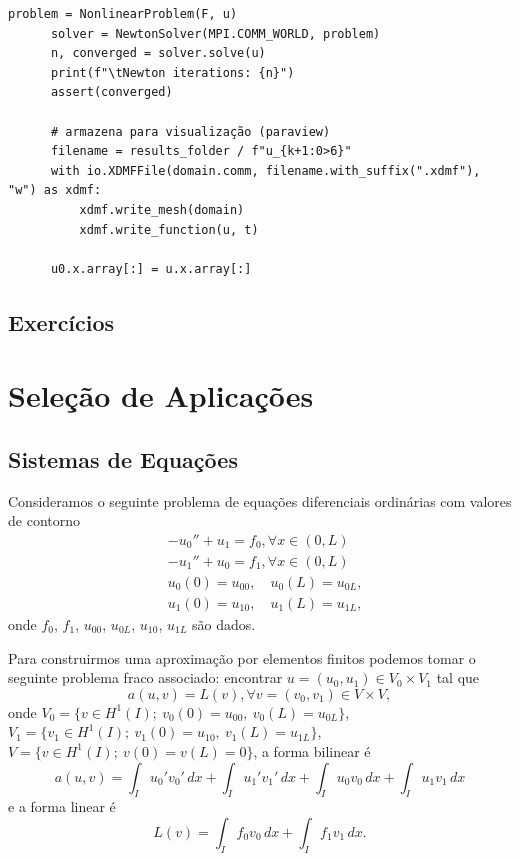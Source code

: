 \begin{ex}
\begin{lstlisting}[caption=ex\_mef1d\_fisher.py]
      problem = NonlinearProblem(F, u)
      solver = NewtonSolver(MPI.COMM_WORLD, problem)
      n, converged = solver.solve(u)
      print(f"\tNewton iterations: {n}")
      assert(converged)
  
      # armazena para visualização (paraview)
      filename = results_folder / f"u_{k+1:0>6}"
      with io.XDMFFile(domain.comm, filename.with_suffix(".xdmf"), "w") as xdmf:
          xdmf.write_mesh(domain)
          xdmf.write_function(u, t)
  
      u0.x.array[:] = u.x.array[:]  
\end{lstlisting}
\end{ex}

\subsection{Exercícios}
\badgeConstrucao


\section{Seleção de Aplicações}\label{cap_mef1d_sec_aps}
\badgeRevisar

\subsection{Sistemas de Equações}
\badgeRevisar

Consideramos o seguinte problema de equações diferenciais ordinárias com valores de contorno
\begin{align}
  &-u_0'' + u_1 = f_0,\forall x\in (0, L)\\ 
  &-u_1'' + u_0 = f_1,\forall x\in (0, L)\\
  &u_0(0)=u_{00},\quad u_0(L)=u_{0L},\\
  &u_1(0)=u_{10},\quad u_1(L)=u_{1L},
\end{align}
onde $f_0$, $f_1$, $u_{00}$, $u_{0L}$, $u_{10}$, $u_{1L}$ são dados.

Para construirmos uma aproximação por elementos finitos podemos tomar o seguinte problema fraco associado: encontrar $u = (u_0, u_1)\in V_0\times V_1$ tal que
\begin{equation}
  a(u, v) = L(v), \forall v = (v_0, v_1)\in V\times V,
\end{equation}
onde $V_0 = \{v\in H^1(I);~v_0(0)=u_{00},~v_0(L)=u_{0L}\}$, $V_1=\{v_1\in H^1(I);~v_1(0)=u_{10},~v_1(L)=u_{1L}\}$, $V = \{v\in H^1(I);~v(0)=v(L)=0\}$, a forma bilinear é
\begin{equation}\label{eq:sis_lin_bilinear}
  a(u, v) = \int_{I} u_0'v_0'\,dx + \int_{I} u_1'v_1'\,dx + \int_{I} u_0v_0\,dx + \int_{I} u_1v_1\,dx
\end{equation}
e a forma linear é
\begin{equation}\label{eq:sis_lin_linear}
  L(v) = \int_I f_0v_0\,dx + \int_I f_1v_1\,dx.
\end{equation}

